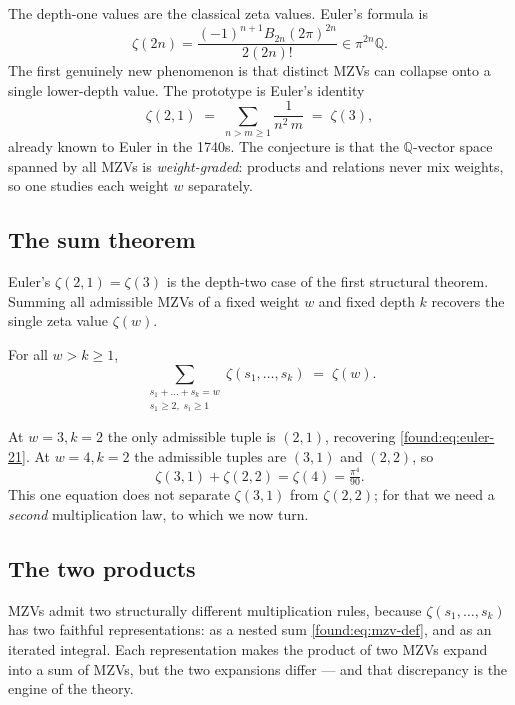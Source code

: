The depth-one values are the classical zeta values. Euler's formula is
\[
\zeta(2n)=\frac{(-1)^{n+1}B_{2n}(2\pi)^{2n}}{2(2n)!}
\in\pi^{2n}\mathbb Q.
\] The first genuinely new phenomenon is that distinct MZVs can collapse onto a single lower-depth value. The prototype is Euler's identity
\begin{equation}
  \zeta(2,1)\;=\;\sum_{n>m\ge1}\frac{1}{n^2\,m}\;=\;\zeta(3),
  \label{found:eq:euler-21}
\end{equation}
already known to Euler in the 1740s. The conjecture is that the $\mathbb{Q}$-vector space spanned by all MZVs is \emph{weight-graded}: products and relations never mix weights, so one studies each weight $w$ separately.

\subsection*{The sum theorem}

Euler's $\zeta(2,1)=\zeta(3)$ is the depth-two case of the first structural theorem. Summing all admissible MZVs of a fixed weight $w$ and fixed depth $k$ recovers the single zeta value $\zeta(w)$.
\begin{theorem}[Sum theorem; Euler for $k=2$, Granville and Zagier in general, 1990s]
For all $w>k\ge1$,
\begin{equation}
  \sum_{\substack{s_1+\dots+s_k=w\\ s_1\ge2,\;s_i\ge1}}\zeta(s_1,\dots,s_k)\;=\;\zeta(w).
  \label{found:eq:sum-thm}
\end{equation}
\end{theorem}
\noindent At $w=3,k=2$ the only admissible tuple is $(2,1)$, recovering \eqref{found:eq:euler-21}. At $w=4,k=2$ the admissible tuples are $(3,1)$ and $(2,2)$, so
\begin{equation}
  \zeta(3,1)+\zeta(2,2)=\zeta(4)=\tfrac{\pi^4}{90}.
  \label{found:eq:sum-wt4}
\end{equation}
This one equation does not separate $\zeta(3,1)$ from $\zeta(2,2)$; for that we need a \emph{second} multiplication law, to which we now turn.

\subsection*{The two products}

MZVs admit two structurally different multiplication rules, because $\zeta(s_1,\dots,s_k)$ has two faithful representations: as a nested sum \eqref{found:eq:mzv-def}, and as an iterated integral. Each representation makes the product of two MZVs expand into a sum of MZVs, but the two expansions differ --- and that discrepancy is the engine of the theory.

